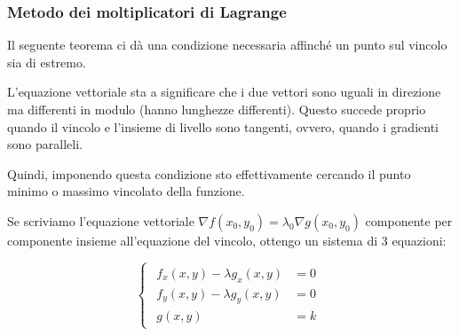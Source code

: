 \pagebreak
\subsubsection{Metodo dei moltiplicatori di Lagrange}

Il seguente teorema ci dà una condizione necessaria affinché un punto sul vincolo sia di estremo.


L'equazione vettoriale sta a significare che i due vettori sono uguali in direzione ma differenti in modulo (hanno lunghezze differenti). Questo succede proprio quando il vincolo e l'insieme di livello sono tangenti, ovvero, quando i gradienti sono paralleli.

Quindi, imponendo questa condizione sto effettivamente cercando il punto minimo o massimo vincolato della funzione.

Se scriviamo l'equazione vettoriale \(\nabla f(x_0,y_0) = \lambda_0 \nabla g(x_0,y_0)\) componente per componente insieme all'equazione del vincolo, ottengo un sistema di 3 equazioni:

\begin{equation*}
    \begin{cases}
        \begin{aligned}
            f_x(x,y) - \lambda g_x(x,y) & = 0 \\
            f_y(x,y) - \lambda g_y(x,y) & = 0 \\
            g(x,y)                      & = k
        \end{aligned}
    \end{cases}
\end{equation*}

